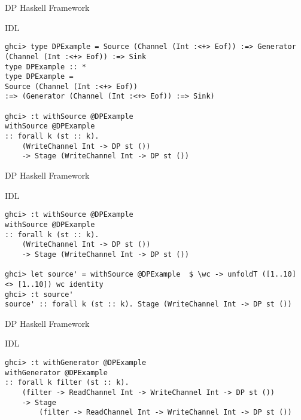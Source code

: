 \begin{frame}[fragile]{DP Haskell Framework}
  \begin{block}{IDL}
    \begin{verbatim}      
ghci> type DPExample = Source (Channel (Int :<+> Eof)) :=> Generator (Channel (Int :<+> Eof)) :=> Sink
type DPExample :: *
type DPExample =
Source (Channel (Int :<+> Eof))
:=> (Generator (Channel (Int :<+> Eof)) :=> Sink)
      
ghci> :t withSource @DPExample
withSource @DPExample
:: forall k (st :: k).
    (WriteChannel Int -> DP st ())
    -> Stage (WriteChannel Int -> DP st ())
  \end{verbatim}
\end{block}
\end{frame}

\begin{frame}[fragile]{DP Haskell Framework}
  \begin{block}{IDL}
    \begin{verbatim}      
ghci> :t withSource @DPExample
withSource @DPExample
:: forall k (st :: k).
    (WriteChannel Int -> DP st ())
    -> Stage (WriteChannel Int -> DP st ())
    
ghci> let source' = withSource @DPExample  $ \wc -> unfoldT ([1..10] <> [1..10]) wc identity
ghci> :t source'
source' :: forall k (st :: k). Stage (WriteChannel Int -> DP st ())
  \end{verbatim}
\end{block}
\end{frame}

\begin{frame}[fragile]{DP Haskell Framework}
  \begin{block}{IDL}
    \begin{verbatim}      
ghci> :t withGenerator @DPExample
withGenerator @DPExample
:: forall k filter (st :: k).
    (filter -> ReadChannel Int -> WriteChannel Int -> DP st ())
    -> Stage
        (filter -> ReadChannel Int -> WriteChannel Int -> DP st ())    
  \end{verbatim}
\end{block}
\end{frame}

